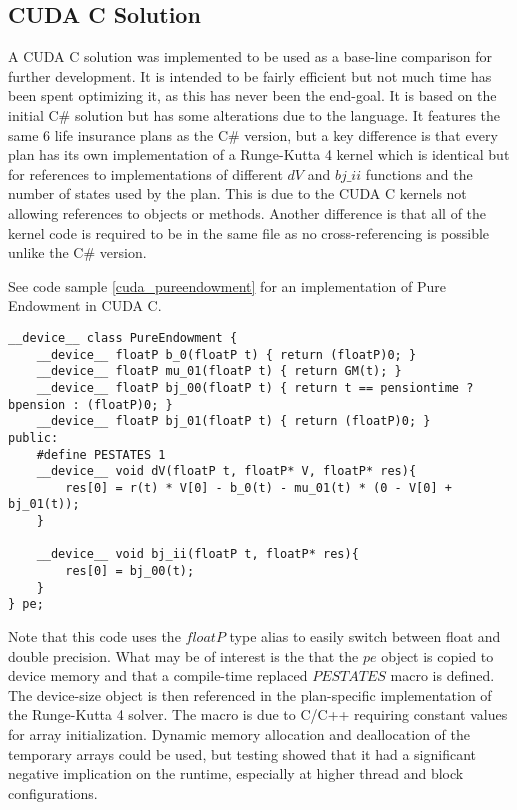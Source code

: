 \subsection{CUDA C Solution}
A CUDA C solution was implemented to be used as a base-line comparison for further development.
It is intended to be fairly efficient but not much time has been spent optimizing it, as this has never been the end-goal.
It is based on the initial C\# solution but has some alterations due to the language.
It features the same 6 life insurance plans as the C\# version, but a key difference is that every plan has its own implementation of a Runge-Kutta 4 kernel which is identical but for references to implementations of different $dV$ and $bj\_ii$ functions and the number of states used by the plan.
This is due to the CUDA C kernels not allowing references to objects or methods. %
Another difference is that all of the kernel code is required to be in the same file as no cross-referencing is possible unlike the C\# version.

See code sample \ref{cuda_pureendowment} for an implementation of Pure Endowment in CUDA C.
\begin{lstlisting}[language=cudac, caption=The pure endowment insurance plan expressed in CUDA C, label=cuda_pureendowment]
__device__ class PureEndowment {
	__device__ floatP b_0(floatP t) { return (floatP)0; }
	__device__ floatP mu_01(floatP t) { return GM(t); }
	__device__ floatP bj_00(floatP t) { return t == pensiontime ? bpension : (floatP)0; }
	__device__ floatP bj_01(floatP t) { return (floatP)0; }
public:
	#define PESTATES 1
	__device__ void dV(floatP t, floatP* V, floatP* res){ 
		res[0] = r(t) * V[0] - b_0(t) - mu_01(t) * (0 - V[0] + bj_01(t));
	}

	__device__ void bj_ii(floatP t, floatP* res){
		res[0] = bj_00(t);
	}
} pe;
\end{lstlisting}

Note that this code uses the $floatP$ type alias to easily switch between float and double precision.
What may be of interest is the that the $pe$ object is copied to device memory and that a compile-time replaced $PESTATES$ macro is defined.
The device-size object is then referenced in the plan-specific implementation of the Runge-Kutta 4 solver.
The macro is due to C/C++ requiring constant values for array initialization.
Dynamic memory allocation and deallocation of the temporary arrays could be used, but testing showed that it had a significant negative implication on the runtime, especially at higher thread and block configurations.

